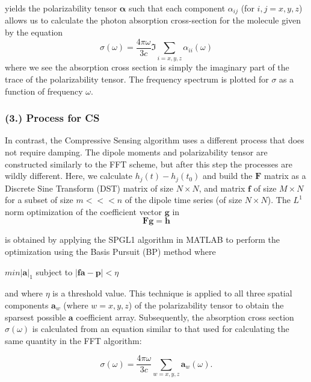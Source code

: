 \documentclass[11pt]{article}
\begin{document}
yields the polarizability tensor $\mathbf{\alpha}$ such that each component $\alpha_{ij}$ (for $i,j = x,y,z$) allows us to calculate the photon absorption cross-section for the molecule given by the equation
$$\sigma(\omega) = \frac{4 \pi \omega}{3c}  \Im\sum_{i = x, y, z} \alpha_{ii}(\omega)$$
where we see the absorption cross section is simply the imaginary part of the trace of the polarizability tensor.  The frequency spectrum is plotted for $\sigma$ as a function of frequency $\omega$.

\subsubsection*{(3.)	Process for CS}

In contrast, the Compressive Sensing algorithm uses a different process that does not require damping.  The dipole moments and polarizability tensor are constructed similarly to the FFT scheme, but after this step the processes are wildly different. Here, we calculate $h_{j}(t) - h_{j}(t_{0})$ and build the $\mathbf{F}$ matrix as a Discrete Sine Transform (DST) matrix of size $N \times N$, and matrix $\mathbf{f}$ of size $M \times N$  for a subset of size $m <<< n$ of the dipole time series (of size $N \times N$).  The $L^{1}$ norm optimization of the coefficient vector $\mathbf{g}$ in 
\begin{equation}
	\mathbf{F}\mathbf{g} = \mathbf{h}
\end{equation}

is obtained by applying the SPGL1 algorithm in MATLAB to perform the optimization using the Basis Pursuit (BP) method where\\
\begin{center}
$min |\mathbf{a}|_{1}$ subject to $|\mathbf{f}\mathbf{a} - \mathbf{p}| < \eta$\\
\end{center}
and where $\eta$ is a threshold value. This technique is applied to all three spatial components $\mathbf{a}_{w}$ (where $w = x,y,z$) of the polarizability tensor to obtain the sparsest possible $\mathbf{a}$ coefficient array.  Subsequently, the absorption cross section $\sigma(\omega)$ is calculated from an equation similar to that used for calculating the same quantity in the FFT algorithm:

\begin{equation}
	\sigma(\omega) = \frac{4\pi\omega}{3c}\sum_{w = x,y,z}\mathbf{a}_{w}(\omega).
\end{equation}
\end{document}
